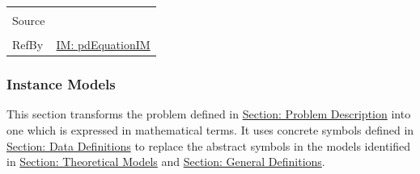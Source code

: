 \documentclass[12pt]{article}
\begin{document}
\begin{minipage}{\textwidth}
\begin{tabular}{>{\raggedright}p{}>{\raggedright\arraybackslash}p{}}
\\ \midrule \\
Source & \cite{johnson2008}
         
\\ \midrule \\
RefBy & \hyperref[IM:pdEquationIM]{IM: pdEquationIM}
        
\\ \bottomrule
\end{tabular}
\end{minipage}

\subsubsection{Instance Models}
\label{Sec:IMs}
This section transforms the problem defined in \hyperref[Sec:ProbDesc]{Section: Problem Description} into one which is expressed in mathematical terms. It uses concrete symbols defined in \hyperref[Sec:DDs]{Section: Data Definitions} to replace the abstract symbols in the models identified in \hyperref[Sec:TMs]{Section: Theoretical Models} and \hyperref[Sec:GDs]{Section: General Definitions}.
\end{document}

